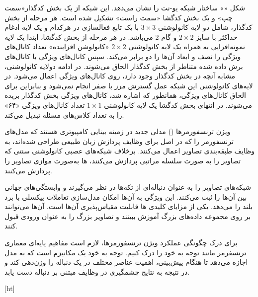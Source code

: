 شکل «» ساختار شبکه یو-نت را نشان می‌دهد. این شبکه از یک بخش کدگذار«سمت چپ» و یک بخش کدگشا «سمت راست» تشکیل شده است. هر مرحله از بخش کدگذار، شامل دو لایه کانولوشنی \(3 \times 3\) با یک تابع فعالسازی  در هرکدام و یک لایه ادغام حداکثر با سایز \(2 \times 2\) و گام \(2\) می‌باشد. در هر مرحله از بخش کدگشا، ابتدا یک لایه نمونه‌افزایی به همراه یک لایه کانولوشنی \(2 \times 2\) «کانولوشن افزاینده» تعداد کانال‌های ویژگی را نصف و ابعاد آن‌ها را دو برابر می‌کند. سپس کانال‌های ویژگی با کانال‌های برش داده شده متناطر از بخش کدگذار الحاق می‌شوند. در ادامه دولایه کانولوشنی، مشابه آنچه در بخش کدگذار وجود دارد، روی کانال‌های ویژگی اعمال می‌شود. در لایه‌های کانولوشنی این شبکه عمل گسترش مرز با صفر انجام نمی‌شود و بنابراین برای الحاق کانال‌های ویژگی، همانطور که اشاره شد، کانال‌های ویژگی بخش کدگذار بریده می‌شوند. در انتهای بخش کدگشا یک لایه کانولوشنی \(1 \times 1\) تعداد کانال‌های ویژگی «۶۴» را به تعداد کلاس‌های مسئله تبدیل می‌کند.






ویژن ترنسفورمرها () مدلی جدید در زمینه بینایی کامپیوتری هستند که مدل‌های ترنسفورمر را که در اصل برای وظایف پردازش زبان طبیعی طراحی شده‌اند، به وظایف طبقه‌بندی تصاویر اعمال می‌کنند. برخلاف شبکه‌های عصبی کانولوشنی سنتی که تصاویر را به صورت سلسله مراتبی پردازش می‌کنند،  ها به‌صورت موازی تصاویر را پردازش می‌کنند.


شبکه‌های  تصاویر را به عنوان دنباله‌ای از تکه‌ها در نظر می‌گیرند و وابستگی‌های جهانی بین آن‌ها را ثبت می‌کنند. این ویژگی به آن‌ها امکان مدل‌سازی تعاملات پیکسلی با برد بلند را می‌دهد. یکی از مزایای کلیدی  ها قابلیت مقیاس‌پذیری آن‌ها است. آن‌ها می‌توانند بر روی مجموعه داده‌های بزرگ آموزش ببینند و تصاویر بزرگ را به عنوان ورودی قبول کنند.




برای درک چگونگی عملکرد ویژن ترنسفورمرها، لازم است مفاهیم پایه‌ای معماری ترنسفرمر مانند توجه به خود را درک کنیم. توجه به خود یک مکانیزم است که به مدل اجازه می‌دهد تا هنگام پیش‌بینی، اهمیت عناصر مختلف در یک دنباله را وزن‌دهی کند و در نتیجه به نتایج چشمگیری در وظایف مبتنی بر دنباله دست یابد.



[ht]


